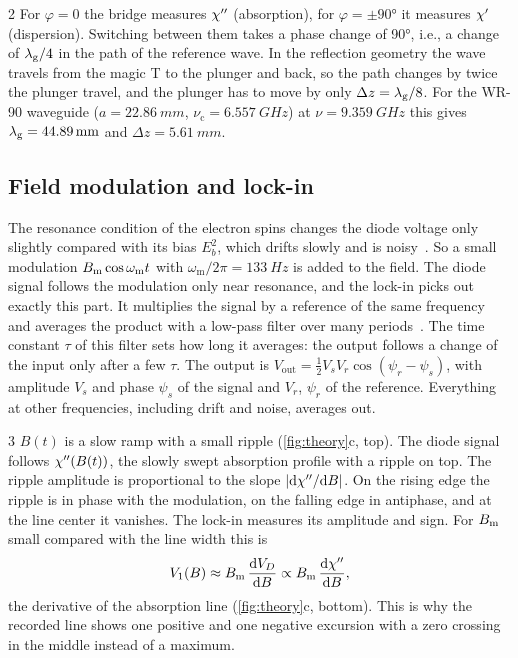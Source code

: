 \begin{exercise}{2}
For $\varphi=0$ the bridge measures $\chi''$ (absorption), for $\varphi=\pm\ang{90}$ it measures $\chi'$ (dispersion).
Switching between them takes a phase change of \ang{90}, i.e., a change of $\lambda_\mathrm{g}/4$ in the path of the reference
wave. In the reflection geometry the wave travels from the magic T to the plunger and back, so the path changes by
twice the plunger travel, and the plunger has to move by only $\Delta z=\lambda_\mathrm{g}/8$. For the WR-90
waveguide ($a=\qty{22.86}{mm}$, $\nu_\mathrm c=\qty{6.557}{GHz}$) at $\nu=\qty{9.359}{GHz}$ this gives
$\lambda_\mathrm{g}=\qty{44.89}{mm}$ and $\Delta z=\qty{5.61}{mm}$.
\end{exercise}

\subsection{Field modulation and lock-in}\label{sec:modulation}

The resonance condition of the electron spins changes the diode voltage only slightly compared with its bias
$E_b^2$, which drifts slowly and is noisy~\cite{poole1996,weil2007}. So a small modulation $B_\mathrm{m}\cos\omega_\mathrm m t$ with
$\omega_\mathrm m/2\pi=\qty{133}{Hz}$ is added to the field. The diode signal follows the modulation only near
resonance, and the lock-in picks out exactly this part. It multiplies the signal by a reference of the same
frequency and averages the product with a low-pass filter over many periods~\cite{sr830}. The time constant $\tau$ of
this filter sets how long it averages: the output follows a change of the input only after a few $\tau$. The output is
$V_\text{out}=\frac12V_sV_r\cos(\psi_r-\psi_s)$, with amplitude $V_s$ and phase $\psi_s$ of the signal and $V_r$, $\psi_r$
of the reference. Everything at other frequencies, including drift and noise, averages out.

\begin{exercise}{3}
$B(t)$ is a slow ramp with a small ripple (\cref{fig:theory}c, top). The diode signal follows
$\chi''(B(t))$, the slowly swept absorption profile with a ripple on top. The ripple amplitude is
proportional to the slope $|\mathrm{d}\chi''/\mathrm{d} B|$. On the rising edge the ripple is in phase with the modulation, on the
falling edge in antiphase, and at the line center it vanishes. The lock-in measures its amplitude and sign.
For $B_\mathrm{m}$ small compared with the line width this is
\begin{equation}\label{eq:harmonic}
  V_1(B)\approx B_\mathrm{m}\,\frac{\mathrm{d} V_D}{\mathrm{d} B}\propto B_\mathrm{m}\,\frac{\mathrm{d}\chi''}{\mathrm{d} B},
\end{equation}
the derivative of the absorption line (\cref{fig:theory}c, bottom). This is why the recorded line shows one positive
and one negative excursion with a zero crossing in the middle instead of a maximum.
\end{exercise}


